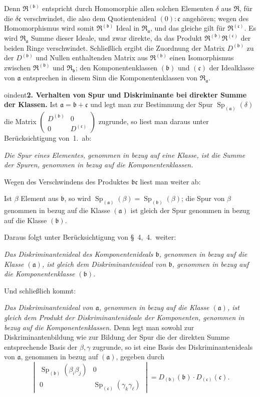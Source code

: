 \documentclass[12pt,a4paper]{article}
\newcommand{\mf}[1]{\mathfrak{#1}}     %
\newcommand{\ideala}{\mathfrak{a}}
\newcommand{\idealb}{\mathfrak{b}}
\newcommand{\idealc}{\mathfrak{c}}
\DeclareMathOperator{\Sp}{Sp}           %
\theoremstyle{definition}
\begin{document}
Denn $\mf{R}^{(\idealb)}$ entspricht durch Homomorphie allen solchen
Elementen $\delta$ aus $\mf{R}$, f\"ur die $\delta\idealc$ verschwindet, die
also dem Quotientenideal $(0):\idealc$ angeh\"oren; wegen des
Homomorphismus wird somit $\mf{R}^{(\idealb)}$ Ideal in
$\mf{R}_{\ideala}$, und das gleiche gilt f\"ur $\mf{R}^{(\idealc)}$.
Es wird $\mf{R}_{\ideala}$ Summe dieser Ideale, und zwar direkte, da das
Produkt $\mf{R}^{(\idealb)}\mf{R}^{(\idealc)}$ der beiden Ringe
verschwindet. Schlie\ss lich ergibt die Zuordnung der Matrix
$D^{(\idealb)}$ zu der $D^{(\idealb)}$ und Nullen enthaltenden Matrix aus
$\mf{R}^{(\idealb)}$ einen Isomorphismus zwischen $\mf{R}^{(\idealb)}$ und
$\mf{R}_{\idealb}$; den Komponentenklassen $(\idealb)$ und $(\idealc)$ der
Idealklasse von $\ideala$ entsprechen in diesem Sinn die Komponentenklassen
von $\mf{R}_{\ideala}$.

\medskip



oindent\textbf{2. Verhalten von Spur und Diskriminante bei direkter Summe der
Klassen.} Ist $\ideala = \idealb + \idealc$ und legt man zur Bestimmung der
Spur $\Sp_{(\ideala)}(\delta)$ die Matrix
$\begin{pmatrix} D^{(\idealb)} & 0 \\ 0 & D^{(\idealc)} \end{pmatrix}$
zugrunde, so liest man daraus unter Ber\"ucksichtigung von~1.\ ab:

\textit{Die Spur eines Elementes, genommen in bezug auf eine Klasse, ist die
Summe der Spuren, genommen in bezug auf die Komponentenklassen.}

Wegen des Verschwindens des Produktes $\idealb\idealc$ liest man weiter ab:

Ist $\beta$ Element aus $\idealb$, so wird
$\Sp_{(\ideala)}(\beta) = \Sp_{(\idealb)}(\beta)$; die Spur von $\beta$
genommen in bezug auf die Klasse $(\ideala)$ ist gleich der Spur genommen
in bezug auf die Klasse $(\idealb)$.

Daraus folgt unter Ber\"ucksichtigung von \S~4,~4.\ weiter:

\textit{Das Diskriminantenideal des Komponentenideals $\idealb$, genommen in
bezug auf die Klasse $(\ideala)$, ist gleich dem Diskriminantenideal von
$\idealb$, genommen in bezug auf die Komponentenklasse $(\idealb)$.}

Und schlie\ss lich kommt:

\textit{Das Diskriminantenideal von $\ideala$, genommen in bezug auf die Klasse
$(\ideala)$, ist gleich dem Produkt der Diskriminantenideale der
Komponenten, genommen in bezug auf die Komponentenklassen.} Denn legt
man sowohl zur Diskriminantenbildung wie zur Bildung der Spur die der
direkten Summe entsprechende Basis der $\beta,\gamma$ zugrunde, so ist eine
Basis des Diskriminantenideals von $\ideala$, genommen in bezug auf
$(\ideala)$, gegeben durch
\[
\begin{vmatrix}
\Sp_{(\idealb)}(\beta_i\beta_j) & 0 \\
0 & \Sp_{(\idealc)}(\gamma_k\gamma_\ell)
\end{vmatrix}
= D_{(\idealb)}(\idealb) \cdot D_{(\idealc)}(\idealc).
\]
\end{document}
